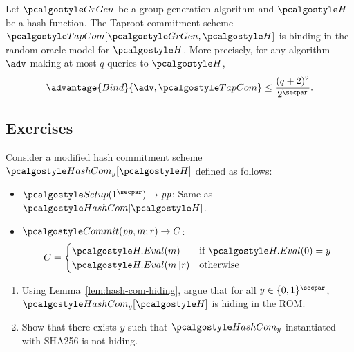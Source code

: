 \begin{lemma}\label{lem:taproot-binding}
  Let $\grgen$ be a group generation algorithm and $\algo{H}$ be a hash function.
  The Taproot commitment scheme $\algo{TapCom}[\grgen, \algo{H}]$ is binding in the random oracle model for $\algo{H}$.
  More precisely, for any algorithm $\adv$ making at most $q$ queries to $\algo{H}$,
  \[
  \advantage{Bind}{\adv, \algo{TapCom}} \leq \frac{(q+2)^2}{2^\secpar}.
  \]
\end{lemma}

\subsection{Exercises}

\begin{exercise}
  Consider a modified hash commitment scheme $\algo{HashCom}_y[\algo{H}]$ defined as follows:
  \begin{itemize}
    \item $\algo{Setup}(1^\secpar) \rightarrow \params$: Same as $\algo{HashCom}[\algo{H}]$.
    \item $\algo{Commit}(\params, m; r) \rightarrow C$: 
    \begin{align*}
      C = \begin{cases}
        \algo{H.Eval}(m) & \text{if } \algo{H.Eval}(0) = y \\
        \algo{H.Eval}(m \| r) & \text{otherwise}
      \end{cases}
    \end{align*}
  \end{itemize}
  
  \begin{enumerate}
    \item Using Lemma~\ref{lem:hash-com-hiding}, argue that for all $y \in \{0,1\}^\secpar$, $\algo{HashCom}_y[\algo{H}]$ is hiding in the ROM.
    \item Show that there exists $y$ such that $\algo{HashCom}_y$ instantiated with SHA256 is not hiding.
  \end{enumerate}
\end{exercise}

